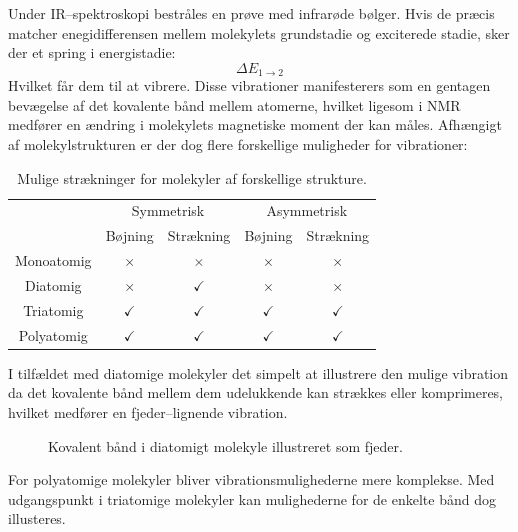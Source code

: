     Under IR--spektroskopi bestråles en prøve med infrarøde bølger. Hvis de præcis matcher enegidifferensen mellem molekylets grundstadie og exciterede stadie, sker der et spring i energistadie:
    \[
        \Delta E_{1 \rightarrow 2}
    \]
    Hvilket får dem til at vibrere. Disse vibrationer manifesterers som en gentagen bevægelse af det kovalente bånd mellem atomerne, hvilket ligesom i NMR medfører en ændring i molekylets magnetiske moment der kan måles. Afhængigt af molekylstrukturen er der dog flere forskellige muligheder for vibrationer:
    \begin{table}[H]\center
        \caption{Mulige strækninger for molekyler af forskellige strukture.}
        \begin{tabular}{ccccc}
            \toprule
            & \multicolumn{2}{c}{Symmetrisk} & \multicolumn{2}{c}{Asymmetrisk} \\
            \cmidrule(r){2-3} \cmidrule(r){4-5}
            & Bøjning & Strækning & Bøjning & Strækning \\
            \midrule
            Monoatomig & $\times$ & $\times$ & $\times$ & $\times$ \\
            Diatomig & $\times$ & $\checkmark$ & $\times$ & $\times$ \\
            Triatomig & $\checkmark$ & $\checkmark$ & $\checkmark$ & $\checkmark$ \\
            Polyatomig & $\checkmark$ & $\checkmark$ & $\checkmark$ & $\checkmark$ \\
            \bottomrule
        \end{tabular}
    \end{table}
    I tilfældet med diatomige molekyler det simpelt at illustrere den mulige vibration da det kovalente bånd mellem dem udelukkende kan strækkes eller komprimeres, hvilket medfører en fjeder--lignende vibration.
    \begin{figure}[H]\centering
        \caption{Kovalent bånd i diatomigt molekyle illustreret som fjeder.}
    \end{figure}
    For polyatomige molekyler bliver vibrationsmulighederne mere komplekse. Med udgangspunkt i triatomige molekyler kan mulighederne for de enkelte bånd dog illusteres. 

